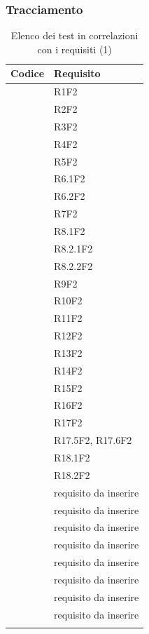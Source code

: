 \newpage

	\subsubsection{Tracciamento} \label{tracciamentovalidazione}
    
    \setcounter{tv}{0}
    
	\begin{table}[H]
		\centering
		{\def\arraystretch{1.4}
		\begin{tabularx}{\textwidth}{YY}
			\textbf{Codice} & \textbf{Requisito} \\
			\toprule
			\addtotv & R1F2 \\
			\addtotv & R2F2 \\
			\addtotv & R3F2 \\
			\addtotv & R4F2 \\
			\addtotv & R5F2 \\
			\addtotv & R6.1F2 \\
			\addtotv & R6.2F2 \\
			\addtotv & R7F2 \\
			\addtotv & R8.1F2 \\
			\addtotv & R8.2.1F2 \\
			\addtotv & R8.2.2F2 \\
			\addtotv & R9F2 \\
			\addtotv & R10F2 \\
			\addtotv & R11F2 \\
			\addtotv & R12F2 \\
			\addtotv & R13F2 \\
			\addtotv & R14F2 \\
			\addtotv & R15F2 \\
			\addtotv & R16F2 \\
			\addtotv & R17F2 \\
			\addtotv & R17.5F2, R17.6F2 \\
			\addtotv & R18.1F2 \\
			\addtotv & R18.2F2 \\
			\addtotv & requisito da inserire \\
			\addtotv & requisito da inserire \\
			\addtotv & requisito da inserire \\
			\addtotv & requisito da inserire \\
			\addtotv & requisito da inserire \\
			\addtotv & requisito da inserire \\
			\addtotv & requisito da inserire \\
			\addtotv & requisito da inserire \\
            \bottomrule\\
            \end{tabularx}}
		\caption{Elenco dei test in correlazioni con i requisiti (1)}
	\end{table}
